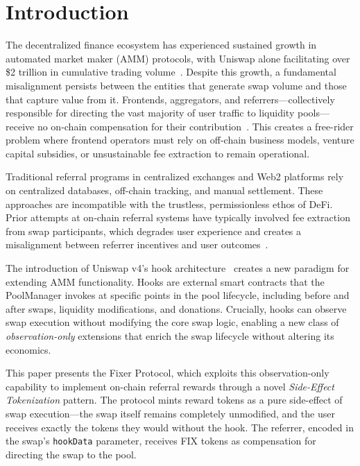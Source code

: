 \documentclass[conference]{IEEEtran}
\begin{document}
\section{Introduction}
\label{sec:intro}

The decentralized finance ecosystem has experienced sustained growth in automated market maker (AMM) protocols, with Uniswap alone facilitating over \$2 trillion in cumulative trading volume~\cite{uniswapv4}. Despite this growth, a fundamental misalignment persists between the entities that generate swap volume and those that capture value from it. Frontends, aggregators, and referrers---collectively responsible for directing the vast majority of user traffic to liquidity pools---receive no on-chain compensation for their contribution~\cite{frontendproblem}. This creates a free-rider problem where frontend operators must rely on off-chain business models, venture capital subsidies, or unsustainable fee extraction to remain operational.

Traditional referral programs in centralized exchanges and Web2 platforms rely on centralized databases, off-chain tracking, and manual settlement. These approaches are incompatible with the trustless, permissionless ethos of DeFi. Prior attempts at on-chain referral systems have typically involved fee extraction from swap participants, which degrades user experience and creates a misalignment between referrer incentives and user outcomes~\cite{flashboys}.

The introduction of Uniswap v4's hook architecture~\cite{uniswapv4} creates a new paradigm for extending AMM functionality. Hooks are external smart contracts that the PoolManager invokes at specific points in the pool lifecycle, including before and after swaps, liquidity modifications, and donations. Crucially, hooks can observe swap execution without modifying the core swap logic, enabling a new class of \textit{observation-only} extensions that enrich the swap lifecycle without altering its economics.

This paper presents the Fixer Protocol, which exploits this observation-only capability to implement on-chain referral rewards through a novel \textit{Side-Effect Tokenization} pattern. The protocol mints reward tokens as a pure side-effect of swap execution---the swap itself remains completely unmodified, and the user receives exactly the tokens they would without the hook. The referrer, encoded in the swap's \texttt{hookData} parameter, receives FIX tokens as compensation for directing the swap to the pool.
\end{document}
